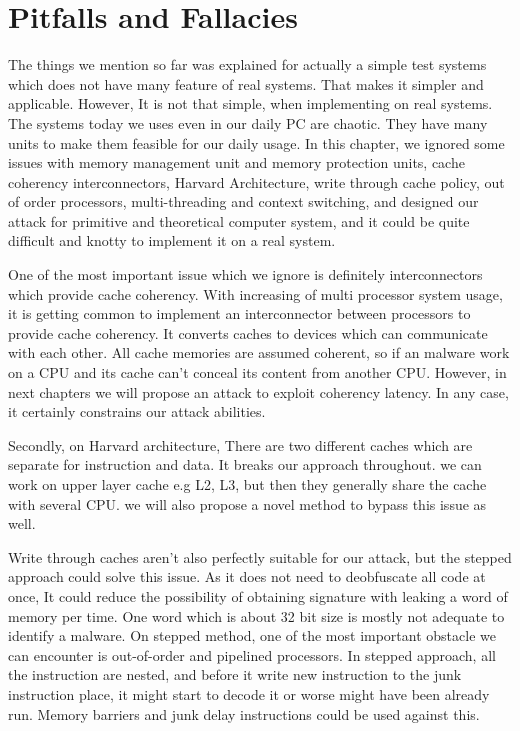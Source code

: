	\section{Pitfalls and Fallacies}
		The things we mention so far was explained for actually a simple test systems which does not have many feature of real systems. That makes it simpler and applicable. However, It is not that simple, when implementing on real systems. The systems today we uses even in our daily PC are chaotic. They have many units to make them feasible for our daily usage. In this chapter, we ignored some issues with memory management unit and memory protection units, cache coherency interconnectors, Harvard Architecture, write through cache policy, out of order processors, multi-threading and context switching, and designed our attack for primitive and theoretical computer system, and it could be quite difficult and knotty to implement it on a real system. 

		One of the most important issue which we ignore is definitely interconnectors which provide cache coherency. With increasing of multi processor system usage, it is getting common to implement an interconnector between processors to provide cache coherency. It converts caches to devices which can communicate with each other. All cache memories are assumed coherent, so if an malware work on a CPU and its cache can't conceal its content from another CPU. However, in next chapters we will propose an attack to exploit coherency latency. In any case, it certainly constrains our attack abilities.

		Secondly, on Harvard architecture, There are two different caches which are separate for instruction and data. It breaks our approach throughout. we can work on upper layer cache e.g L2, L3, but then they generally share the cache with several CPU. we will also propose a novel method to bypass this issue as well.

		Write through caches aren't also perfectly suitable for our attack, but the stepped approach could solve this issue. As it does not need to deobfuscate all code at once, It could reduce the possibility of obtaining signature with leaking a word of memory per time. One word which is about 32 bit size is mostly not adequate to identify a malware. On stepped method, one of the most important obstacle we can encounter is out-of-order and pipelined processors. In stepped approach, all the instruction are nested, and before it write new instruction to the junk instruction place, it might start to decode it or worse might have been already run. Memory barriers and junk delay instructions could be used against this.

